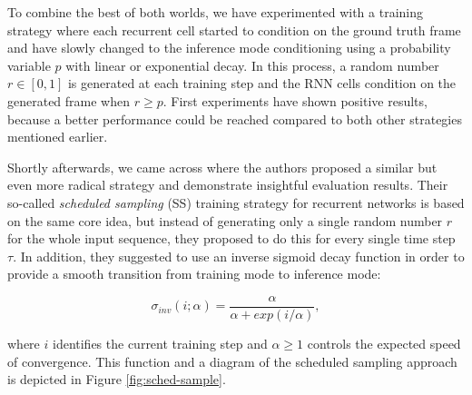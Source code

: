 To combine the best of both worlds, we have experimented with a training strategy where each recurrent cell started to condition on the ground truth frame and have slowly changed to the inference mode conditioning using a probability variable $p$ with linear or exponential decay. In this process, a random number $r \in [0, 1]$ is generated at each training step and the RNN cells condition on the generated frame when $r \geq p$. First experiments have shown positive results, because a better performance could be reached compared to both other strategies mentioned earlier. 

Shortly afterwards, we came across \parencite{sched_sample} where the authors proposed a similar but even more radical strategy and demonstrate insightful evaluation results. Their so-called \textit{scheduled sampling} (SS) training strategy for recurrent networks is based on the same core idea, but instead of generating only a single random number $r$ for the whole input sequence, they proposed to do this for every single time step $\tau$. In addition, they suggested to use an inverse sigmoid decay function in order to provide a smooth transition from training mode to inference mode:

\begin{equation} \label{eq:inverse-sigmoid}
\sigma_{inv}(i; \alpha) = \frac{\alpha}{\alpha + exp(i / \alpha)} ,
\end{equation}

where $i$ identifies the current training step and $\alpha \geq 1$ controls the expected speed of convergence. This function and a diagram of the scheduled sampling approach is depicted in Figure \ref{fig:sched-sample}.

